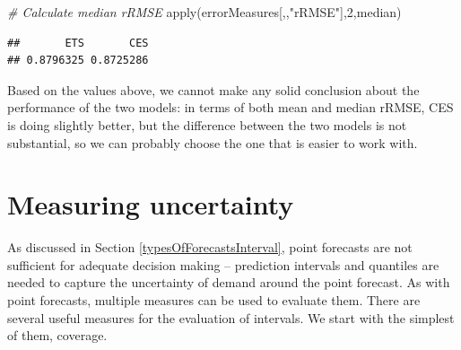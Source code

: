 \documentclass[
]{book}
\newenvironment{Shaded}{\begin{snugshade}}{\end{snugshade}}
\newcommand{\CommentTok}[1]{\textcolor[rgb]{0.56,0.35,0.01}{\textit{#1}}}
\newcommand{\DecValTok}[1]{\textcolor[rgb]{0.00,0.00,0.81}{#1}}
\newcommand{\FunctionTok}[1]{\textcolor[rgb]{0.00,0.00,0.00}{#1}}
\newcommand{\NormalTok}[1]{#1}
\newcommand{\StringTok}[1]{\textcolor[rgb]{0.31,0.60,0.02}{#1}}
\theoremstyle{definition}
\theoremstyle{definition}
\theoremstyle{definition}
\theoremstyle{definition}
\theoremstyle{remark}
\begin{document}
\begin{Shaded}
\begin{Highlighting}[]
\CommentTok{\# Calculate median rRMSE}
\FunctionTok{apply}\NormalTok{(errorMeasures[,,}\StringTok{"rRMSE"}\NormalTok{],}\DecValTok{2}\NormalTok{,median)}
\end{Highlighting}
\end{Shaded}

\begin{verbatim}
##       ETS       CES 
## 0.8796325 0.8725286
\end{verbatim}

Based on the values above, we cannot make any solid conclusion about the performance of the two models: in terms of both mean and median rRMSE, CES is doing slightly better, but the difference between the two models is not substantial, so we can probably choose the one that is easier to work with.

\hypertarget{uncertainty}{%
\section{Measuring uncertainty}\label{uncertainty}}

As discussed in Section \ref{typesOfForecastsInterval}, point forecasts are not sufficient for adequate decision making -- prediction intervals and quantiles are needed to capture the uncertainty of demand around the point forecast. As with point forecasts, multiple measures can be used to evaluate them. There are several useful measures for the evaluation of intervals. We start with the simplest of them, coverage.
\end{document}
